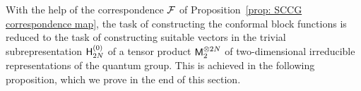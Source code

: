 \documentclass[oneside,english]{amsart}
\numberwithin{equation}{section}
\numberwithin{figure}{section}
\theoremstyle{plain}
\theoremstyle{plain}
\theoremstyle{plain}
\theoremstyle{remark}
\theoremstyle{plain}
\theoremstyle{plain}
\theoremstyle{plain}
\theoremstyle{plain}
\theoremstyle{plain}
\theoremstyle{plain}
\theoremstyle{plain}
\theoremstyle{plain}
\newcommand{\red}[1]{{\color{red} #1}}
\begin{document}

With the help of the correspondence $\mathcal{F}$ of Proposition~\ref{prop: SCCG correspondence map},
the task of constructing the conformal block functions is reduced to the task of
constructing suitable vectors in the trivial subrepresentation $\mathsf{H}_{2N}^{(0)}$ %
of a tensor product $\mathsf{M}_2^{\otimes 2N}$ of
two-dimensional irreducible representations of the quantum group. This is achieved in the following 
proposition, which we prove in the end of this section.
\end{document}
